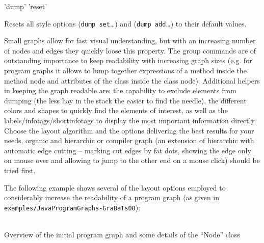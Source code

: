 \begin{rail}
  'dump' 'reset'
\end{rail}
Resets all style options (\texttt{dump set}\dots) and (\texttt{dump add}\dots) to their default values.


\begin{note}\label{note:visual}
Small graphs allow for fast visual understanding, but with an increasing number of nodes and edges they quickly loose this property.
The group commands are of outstanding importance to keep readability with increasing graph sizes
(e.g. for program graphs it allows to lump together expressions of a method inside the method node and attributes of the class inside the class node).
Additional helpers in keeping the graph readable are: 
the capability to exclude elements from dumping (the less hay in the stack the easier to find the needle),
the different colors and shapes to quickly find the elements of interest,
as well as the labels/infotags/shortinfotags to display the most important information directly. 
Choose the layout algorithm and the options delivering the best results for your needs, organic and hierarchic or compiler graph 
(an extension of hierarchic with automatic edge cutting -- marking cut edges by fat dots, showing the edge only on mouse over and allowing to jump to the other end on a mouse click)
should be tried first.
\end{note}

The following example shows several of the layout options employed to considerably increase the readability of a program graph (as given in \texttt{examples/JavaProgramGraphs-GraBaTs08}):
\begin{center}
    \hfill {}\\
  {\small Overview of the initial program graph and some details of the ``Node'' class}
\end{center}


